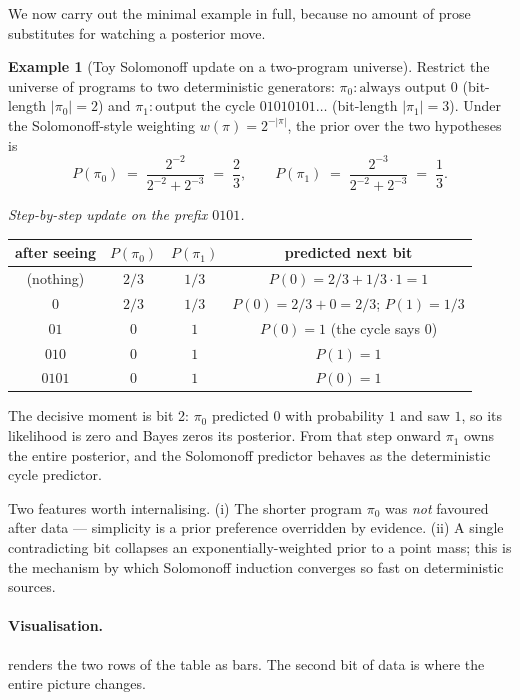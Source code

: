 \documentclass[12pt,a4paper]{article}
\theoremstyle{plain}
\theoremstyle{definition}
\newtheorem{example}[theorem]{Example}
\begin{document}
We now carry out the minimal example in full, because no amount of
prose substitutes for watching a posterior move.

\begin{example}[Toy Solomonoff update on a two-program universe]
\label{ex:toy-solomonoff}
Restrict the universe of programs to two deterministic generators:
$\pi_0 : \text{always output }0$ (bit-length $|\pi_0| = 2$) and
$\pi_1 : \text{output the cycle } 01010101\ldots$ (bit-length
$|\pi_1| = 3$).  Under the Solomonoff-style weighting
$w(\pi) = 2^{-|\pi|}$, the prior over the two hypotheses is
\[
  P(\pi_0) \;=\; \frac{2^{-2}}{2^{-2} + 2^{-3}} \;=\; \frac{2}{3},
  \qquad
  P(\pi_1) \;=\; \frac{2^{-3}}{2^{-2} + 2^{-3}} \;=\; \frac{1}{3}.
\]

\noindent\emph{Step-by-step update on the prefix $0101$.}

\begin{center}
\begin{tabular}{c|cc|c}
after seeing & $P(\pi_0)$ & $P(\pi_1)$ & predicted next bit \\\hline
(nothing) & $2/3$ & $1/3$ & $P(0)=2/3+1/3\cdot 1=1$ \\
$0$       & $2/3$ & $1/3$ & $P(0)=2/3+0=2/3$; $P(1)=1/3$ \\
$01$      & $0$   & $1$   & $P(0)=1$ (the cycle says $0$) \\
$010$     & $0$   & $1$   & $P(1)=1$ \\
$0101$    & $0$   & $1$   & $P(0)=1$ \\
\end{tabular}
\end{center}

\noindent The decisive moment is bit 2: $\pi_0$ predicted $0$ with
probability $1$ and saw $1$, so its likelihood is zero and Bayes
zeros its posterior.  From that step onward $\pi_1$ owns the entire
posterior, and the Solomonoff predictor behaves as the deterministic
cycle predictor.

Two features worth internalising.  (i) The shorter program $\pi_0$
was \emph{not} favoured after data --- simplicity is a prior
preference overridden by evidence.  (ii) A single contradicting bit
collapses an exponentially-weighted prior to a point mass; this is
the mechanism by which Solomonoff induction converges so fast on
deterministic sources.

\paragraph{Visualisation.}
 renders the two rows of the table as
bars.  The second bit of data is where the entire picture changes.


\end{example}
\end{document}
